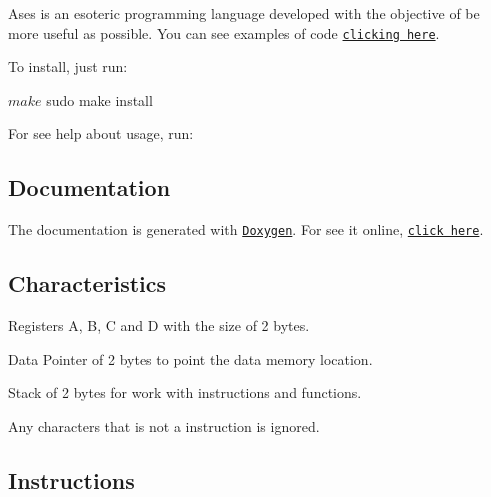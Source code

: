 Ases is an esoteric programming language developed with the objective of be more useful as possible. You can see examples of code \href{examples/}{\tt clicking here}.

To install, just run\+: 
\begin{DoxyCode}
$ make
$ sudo make install
\end{DoxyCode}


For see help about usage, run\+: 


\subsection*{Documentation}

The documentation is generated with \href{http://www.doxygen.nl/}{\tt Doxygen}. For see it online, \href{https://silva97.github.io/Ases/html/index.html}{\tt click here}.

\subsection*{Characteristics}


\begin{DoxyItemize}
\item Registers A, B, C and D with the size of 2 bytes.
\item Data Pointer of 2 bytes to point the data memory location.
\item Stack of 2 bytes for work with instructions and functions.
\item Any characters that is not a instruction is ignored.
\end{DoxyItemize}

\subsection*{Instructions}

